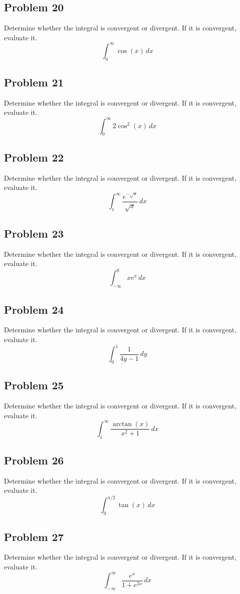 \documentclass{article}
\begin{document}
\subsection*{Problem 20}
Determine whether the integral is convergent or divergent. If it is convergent, evaluate it.
\[ \int_{0}^{\infty} \cos(x) \,dx \]

\subsection*{Problem 21}
Determine whether the integral is convergent or divergent. If it is convergent, evaluate it.
\[ \int_{0}^{\infty} 2\cos^2(x) \,dx \]

\subsection*{Problem 22}
Determine whether the integral is convergent or divergent. If it is convergent, evaluate it.
\[ \int_{1}^{\infty} \frac{e^{-\sqrt{x}}}{\sqrt{x}} \,dx \]

\subsection*{Problem 23}
Determine whether the integral is convergent or divergent. If it is convergent, evaluate it.
\[ \int_{-\infty}^{0} xe^x \,dx \]

\subsection*{Problem 24}
Determine whether the integral is convergent or divergent. If it is convergent, evaluate it.
\[ \int_{0}^{1} \frac{1}{4y-1} \,dy \]

\subsection*{Problem 25}
Determine whether the integral is convergent or divergent. If it is convergent, evaluate it.
\[ \int_{1}^{\infty} \frac{\arctan(x)}{x^2+1} \,dx \]

\subsection*{Problem 26}
Determine whether the integral is convergent or divergent. If it is convergent, evaluate it.
\[ \int_{0}^{\pi/2} \tan(x) \,dx \]

\subsection*{Problem 27}
Determine whether the integral is convergent or divergent. If it is convergent, evaluate it.
\[ \int_{-\infty}^{\infty} \frac{e^x}{1+e^{2x}} \,dx \]
\end{document}
